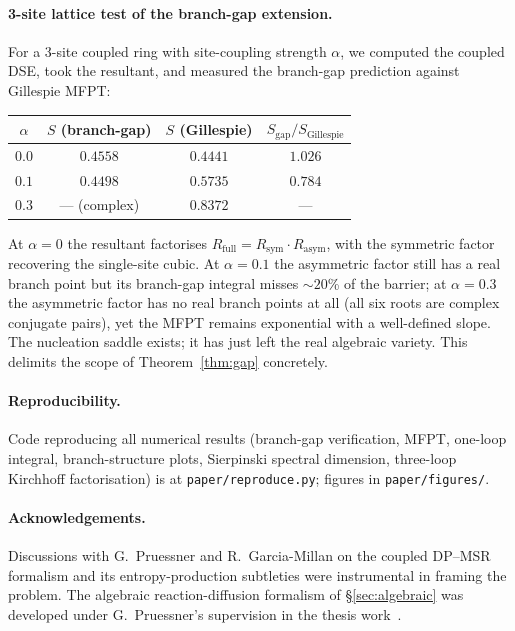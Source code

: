 \documentclass[11pt,a4paper]{article}
\theoremstyle{plain}
\begin{document}
\paragraph{3-site lattice test of the branch-gap extension.}
For a 3-site coupled ring with site-coupling strength $\alpha$,
we computed the coupled DSE, took the resultant, and measured
the branch-gap prediction against Gillespie MFPT:

\begin{center}\small
\begin{tabular}{@{}cccc@{}}\toprule
$\alpha$ & $S$ (branch-gap) & $S$ (Gillespie) & $S_{\mathrm{gap}}/S_{\mathrm{Gillespie}}$ \\ \midrule
$0.0$ & $0.4558$ & $0.4441$ & $1.026$ \\
$0.1$ & $0.4498$ & $0.5735$ & $0.784$ \\
$0.3$ & --- (complex) & $0.8372$ & --- \\
\bottomrule\end{tabular}
\end{center}
At $\alpha = 0$ the resultant factorises $R_\text{full} =
R_\text{sym} \cdot R_\text{asym}$, with the symmetric factor
recovering the single-site cubic.  At $\alpha = 0.1$ the
asymmetric factor still has a real branch point but its
branch-gap integral misses $\sim 20$\% of the barrier; at
$\alpha = 0.3$ the asymmetric factor has no real branch points at
all (all six roots are complex conjugate pairs), yet the MFPT
remains exponential with a well-defined slope.  The nucleation
saddle exists; it has just left the real algebraic variety.
This delimits the scope of Theorem~\ref{thm:gap} concretely.

\paragraph{Reproducibility.}
Code reproducing all numerical results (branch-gap verification,
MFPT, one-loop integral, branch-structure plots, Sierpinski
spectral dimension, three-loop Kirchhoff factorisation) is at
\texttt{paper/reproduce.py}; figures in \texttt{paper/figures/}.

\paragraph{Acknowledgements.}
Discussions with G.~Pruessner and R.~Garcia-Millan on the coupled
DP--MSR formalism and its entropy-production subtleties were
instrumental in framing the problem.  The algebraic
reaction-diffusion formalism of \S\ref{sec:algebraic} was
developed under G.~Pruessner's supervision in the thesis
work~\cite{Amarteifio2019Thesis}.
\end{document}

